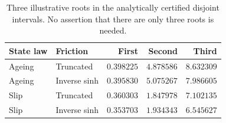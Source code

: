 \documentclass[11pt,a4paper]{article}
\theoremstyle{definition}\newtheorem{definition}[theorem]{Definition}
\theoremstyle{remark}\newtheorem{remark}[theorem]{Remark}
\numberwithin{equation}{section}
\begin{document}
\begin{table}[ht]
\centering
\caption{Three illustrative roots in the analytically certified disjoint intervals. No assertion that there are only three roots is needed.}
\begin{tabular}{llrrr}
\toprule
State law & Friction & First & Second & Third\\\midrule
Ageing & Truncated & $0.398225$ & $4.878586$ & $8.632309$\\
Ageing & Inverse sinh & $0.395830$ & $5.075267$ & $7.986605$\\
Slip & Truncated & $0.360303$ & $1.847978$ & $7.102135$\\
Slip & Inverse sinh & $0.353703$ & $1.934343$ & $6.545627$\\\bottomrule
\end{tabular}
\end{table}
\end{document}
